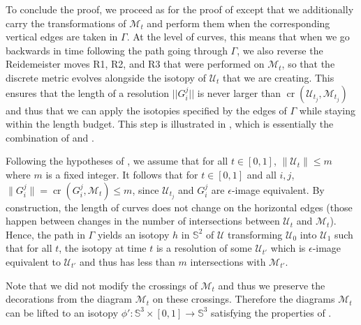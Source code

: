 \documentclass[10pt,a4paper]{amsart}
\newcommand{\Sp}{\mathbb{S}}
\newcommand{\cross}{\operatorname{cr}}
\begin{document}
To conclude the proof, we proceed as for the proof of  except that we additionally carry the transformations of $\mathcal{M}_t$ and perform them when the corresponding vertical edges are taken in $\Gamma$. At the level of curves, this means that when we go backwards in time following the path going through $\Gamma$, we also reverse the Reidemeister moves R1, R2, and R3 that were performed on $\mathcal{M}_t$, so that the discrete metric evolves alongside the isotopy of $\mathcal{U}_t$ that we are creating. This ensures that the length of a resolution $||G^j_i||$ is never larger than $\cross(\mathcal{U}_{t_j},\mathcal{M}_{t_j})$ and thus that we can apply the isotopies specified by the edges of $\Gamma$ while staying within the length budget. This step is illustrated in , which is essentially the combination of  and . 

Following the hypotheses of , we assume that for all $t \in [0,1]$, $\| \mathcal{U}_t \| \leq m$ where $m$ is a fixed integer. It follows that for $t \in [0,1]$ and all $i,j$, $\| G^j_i \| = \cross (G^j_i , \mathcal{M}_t) \leq m$, since $\mathcal{U}_{t_j}$ and $G^j_i$ are $\epsilon$-image equivalent. By construction, the length of curves does not change on the horizontal edges (those happen between changes in the number of intersections between $\mathcal{U}_t$ and $\mathcal{M}_t$). Hence, the path in $\Gamma$ yields an isotopy $h$ in $\Sp^2$ of $\mathcal{U}$ transforming $\mathcal{U}_0$ into $\mathcal{U}_1$ such that for all $t$, the isotopy at time $t$ is a resolution of some $\mathcal{U}_{t'}$ which is $\epsilon$-image equivalent to $ \mathcal{U}_{t'}$ and thus has less than $m$ intersections with $\mathcal{M}_{t'}$. 

Note that we did not modify the crossings of $\mathcal{M}_t$ and thus we preserve the decorations from the diagram $\mathcal{M}_t$ on these crossings. Therefore the diagrams $\mathcal{M}_t$ can be lifted to an isotopy $\phi' : \Sp^3 \times [0,1] \rightarrow \Sp^3$ satisfying the properties of .
\end{document}
